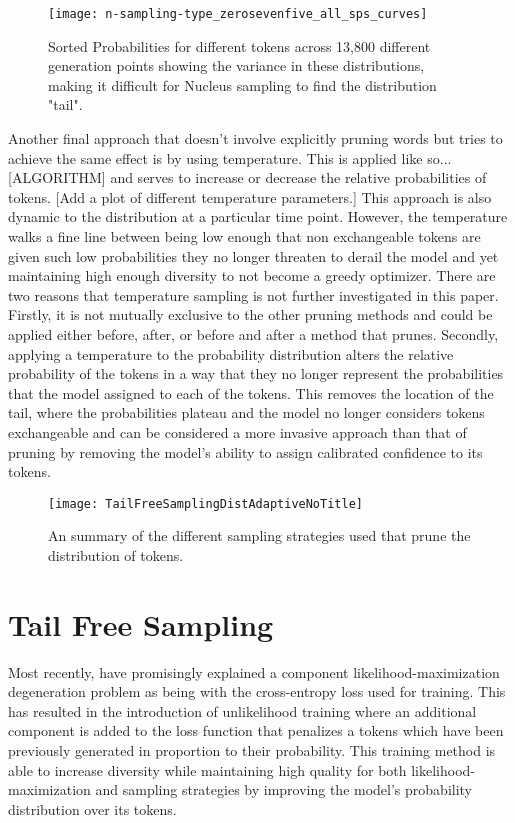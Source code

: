 \documentclass{article}
\begin{document}
\begin{figure}[h]
    \texttt{[image: n-sampling-type\_zerosevenfive\_all\_sps\_curves]}
    \caption{Sorted Probabilities for different tokens across 13,800 different generation points showing the variance in these distributions, making it difficult for Nucleus sampling to find the distribution "tail".}
    \label{fig:allDistributionCurves}
\end{figure}

Another final approach that doesn't involve explicitly pruning words but tries to achieve the same effect is by using temperature. This is applied like so... [ALGORITHM] and serves to increase or decrease the relative probabilities of tokens. [Add a plot of different temperature parameters.] This approach is also dynamic to the distribution at a particular time point. However, the temperature walks a fine line between being low enough that non exchangeable tokens are given such low probabilities they no longer threaten to derail the model and yet maintaining high enough diversity to not become a greedy optimizer. There are two reasons that temperature sampling is not further investigated in this paper. Firstly, it is not mutually exclusive to the other pruning methods and could be applied either before, after, or before and after a method that prunes. Secondly, applying a temperature to the probability distribution alters the relative probability of the tokens in a way that they no longer represent the probabilities that the model assigned to each of the tokens. This removes the location of the tail, where the probabilities plateau and the model no longer considers tokens exchangeable and can be considered a more invasive approach than that of pruning by removing the model's ability to assign calibrated confidence to its tokens.  

\begin{figure}[h]
    \texttt{[image: TailFreeSamplingDistAdaptiveNoTitle]}
    \caption{An summary of the different sampling strategies used that prune the distribution of tokens.}
    \label{fig:diffSamplingOverview}
\end{figure}

\section{Tail Free Sampling}

Most recently, \cite{UnLikelihood} have promisingly explained a component likelihood-maximization degeneration problem as being with the cross-entropy loss used for training. This has resulted in the introduction of unlikelihood training where an additional component is added to the loss function that penalizes a tokens which have been previously generated in proportion to their probability. This training method is able to increase diversity while maintaining high quality for both likelihood-maximization and sampling strategies by improving the model's probability distribution over its tokens.
\end{document}
